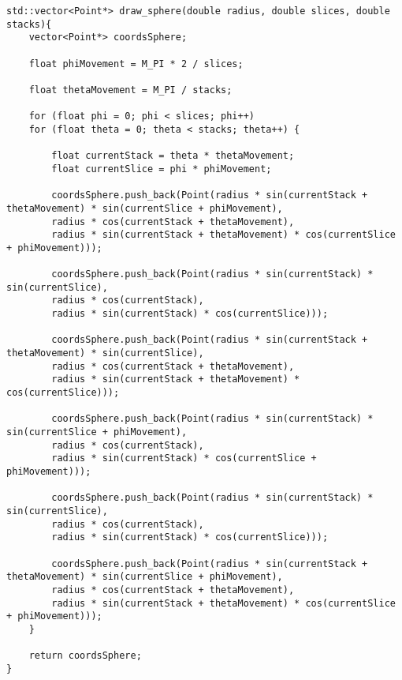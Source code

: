 \begin{lstlisting}
std::vector<Point*> draw_sphere(double radius, double slices, double stacks){
    vector<Point*> coordsSphere;

    float phiMovement = M_PI * 2 / slices;

    float thetaMovement = M_PI / stacks;

    for (float phi = 0; phi < slices; phi++)
    for (float theta = 0; theta < stacks; theta++) {

        float currentStack = theta * thetaMovement;
        float currentSlice = phi * phiMovement;

        coordsSphere.push_back(Point(radius * sin(currentStack + thetaMovement) * sin(currentSlice + phiMovement),
        radius * cos(currentStack + thetaMovement),
        radius * sin(currentStack + thetaMovement) * cos(currentSlice + phiMovement)));

        coordsSphere.push_back(Point(radius * sin(currentStack) * sin(currentSlice),
        radius * cos(currentStack),
        radius * sin(currentStack) * cos(currentSlice)));

        coordsSphere.push_back(Point(radius * sin(currentStack + thetaMovement) * sin(currentSlice),
        radius * cos(currentStack + thetaMovement),
        radius * sin(currentStack + thetaMovement) * cos(currentSlice)));

        coordsSphere.push_back(Point(radius * sin(currentStack) * sin(currentSlice + phiMovement),
        radius * cos(currentStack),
        radius * sin(currentStack) * cos(currentSlice + phiMovement)));

        coordsSphere.push_back(Point(radius * sin(currentStack) * sin(currentSlice),
        radius * cos(currentStack),
        radius * sin(currentStack) * cos(currentSlice)));

        coordsSphere.push_back(Point(radius * sin(currentStack + thetaMovement) * sin(currentSlice + phiMovement),
        radius * cos(currentStack + thetaMovement),
        radius * sin(currentStack + thetaMovement) * cos(currentSlice + phiMovement)));
    }

    return coordsSphere;
}

\end{lstlisting}
